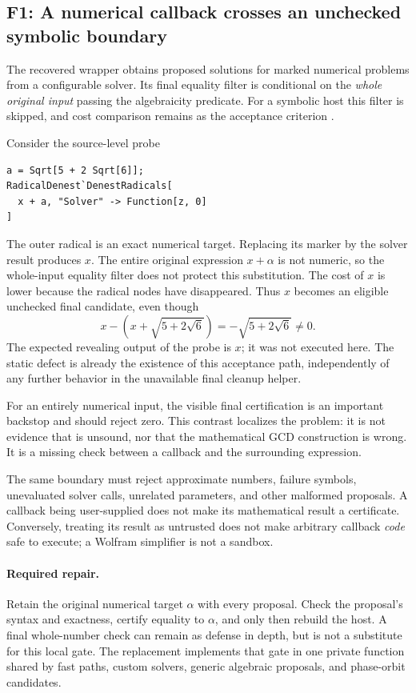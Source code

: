 \documentclass[11pt,letterpaper]{article}
\numberwithin{equation}{section}
\theoremstyle{definition}\newtheorem{definition}[theorem]{Definition}
\theoremstyle{remark}\newtheorem{remark}[theorem]{Remark}
\newcommand{\code}[1]{\texttt{\detokenize{#1}}}
\newcommand{\finding}[2]{\subsection{#1: #2}}
\begin{document}
\finding{F1}{A numerical callback crosses an unchecked symbolic boundary}
The recovered wrapper obtains proposed solutions for marked numerical problems from a configurable solver. Its final equality filter is conditional on the \emph{whole original input} passing the algebraicity predicate. For a symbolic host this filter is skipped, and cost comparison remains as the acceptance criterion \cite{repo-code}.

Consider the source-level probe
\begin{lstlisting}
a = Sqrt[5 + 2 Sqrt[6]];
RadicalDenest`DenestRadicals[
  x + a, "Solver" -> Function[z, 0]
]
\end{lstlisting}
The outer radical is an exact numerical target. Replacing its marker by the solver result produces $x$. The entire original expression $x+\alpha$ is not numeric, so the whole-input equality filter does not protect this substitution. The cost of $x$ is lower because the radical nodes have disappeared. Thus $x$ becomes an eligible unchecked final candidate, even though
\[
 x-(x+\sqrt{5+2\sqrt6})=-\sqrt{5+2\sqrt6}\ne0.
\]
The expected revealing output of the probe is $x$; it was not executed here. The static defect is already the existence of this acceptance path, independently of any further behavior in the unavailable final cleanup helper.

For an entirely numerical input, the visible final certification is an important backstop and should reject zero. This contrast localizes the problem: it is not evidence that \code{RootReduce} is unsound, nor that the mathematical GCD construction is wrong. It is a missing check between a callback and the surrounding expression.

The same boundary must reject approximate numbers, failure symbols, unevaluated solver calls, unrelated parameters, and other malformed proposals. A callback being user-supplied does not make its mathematical result a certificate. Conversely, treating its result as untrusted does not make arbitrary callback \emph{code} safe to execute; a Wolfram simplifier is not a sandbox.

\paragraph{Required repair.}
Retain the original numerical target $\alpha$ with every proposal. Check the proposal's syntax and exactness, certify equality to $\alpha$, and only then rebuild the host. A final whole-number check can remain as defense in depth, but is not a substitute for this local gate. The replacement implements that gate in one private \code{accept} function shared by fast paths, custom solvers, generic algebraic proposals, and phase-orbit candidates.
\end{document}
